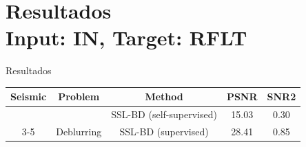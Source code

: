 \section{Resultados\\Input: IN, Target: RFLT}

\begin{frame}{Resultados}

\begin{table}[]
\begin{tabular}{|c|c|c|c|c|}
\hline
\rowcolor[HTML]{EFEFEF} 
Seismic                   & Problem                      & Method                                      & PSNR                          & SNR2                         \\ \hline
                          &                              & SSL-BD (self-supervised)                    & 15.03                         & 0.30                         \\ \cline{3-5} 
\multirow{-2}{*}{IN-RFLT} & \multirow{-2}{*}{Deblurring} & \cellcolor[HTML]{EFEFEF}SSL-BD (supervised) & \cellcolor[HTML]{EFEFEF}28.41 & \cellcolor[HTML]{EFEFEF}0.85 \\ \hline
\end{tabular}
\end{table}
    
\end{frame}
